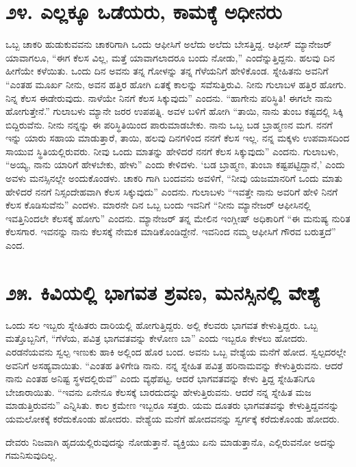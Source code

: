 \section{\num{೨೪. } ಎಲ್ಲಕ್ಕೂ ಒಡೆಯರು, ಕಾಮಕ್ಕೆ ಅಧೀನರು}

ಒಬ್ಬ ಚಾಕರಿ ಹುಡುಕುವವನು ಚಾಕರಿಗಾಗಿ ಒಂದು ಆಫೀಸಿಗೆ ಅಲೆದು ಅಲೆದು ಬೇಸತ್ತಿದ್ದ. ಆಫೀಸ್ ಮ್ಯಾನೇಜರ್ ಯಾವಾಗಲೂ, “ಈಗ ಕೆಲಸ ವಿಲ್ಲ, ಮತ್ತೆ ಯಾವಾಗಲಾದರೂ ಬಂದು ನೋಡು,” ಎಂದೆನ್ನುತ್ತಿದ್ದನು. ಹಲವು ದಿನ ಹೀಗೆಯೇ ಕಳೆಯಿತು. ಒಂದು ದಿನ ಅವನು ತನ್ನ ಗೋಳನ್ನು ತನ್ನ ಗೆಳೆಯನಿಗೆ ಹೇಳಿಕೊಂಡ. ಸ್ನೇಹಿತನು ಅವನಿಗೆ “ಎಂತಹ ಮೂರ್ಖ ನೀನು, ಅವನ ಹತ್ತಿರ ಹೋಗಿ ಏತಕ್ಕೆ ಕಾಲನ್ನು ಸವೆಸುತ್ತಿರುವಿ. ನೀನು ಗುಲಾಬಳ ಹತ್ತಿರ ಹೋಗು. ನಿನ್ನ ಕೆಲಸ ಈಡೇರುವುದು. ನಾಳೆಯೇ ನಿನಗೆ ಕೆಲಸ ಸಿಕ್ಕುವುದು” ಎಂದನು. “ಹಾಗೇನು ಪರಿಸ್ಥಿತಿ! ಈಗಲೇ ನಾನು ಹೋಗುತ್ತೇನೆ.” ಗುಲಾಬಳು ಮ್ಯಾನೇ ಜರರ ಉಪಪತ್ನಿ. ಅವಳ ಬಳಿಗೆ ಹೋಗಿ “ತಾಯಿ, ನಾನು ತುಂಬ ಕಷ್ಟದಲ್ಲಿ ಸಿಕ್ಕಿ ಬಿದ್ದಿರುವೆನು. ನೀನು ನನ್ನನ್ನು ಈ ಪರಿಸ್ಥಿತಿಯಿಂದ ಪಾರುಮಾಡಬೇಕು. ನಾನು ಒಬ್ಬ ಬಡ ಬ್ರಾಹ್ಮಣನ ಮಗ. ನನಗೆ ಇನ್ನು ಯಾರು ಸಹಾಯ ಮಾಡುತ್ತಾರೆ, ತಾಯಿ, ಹಲವು ದಿನಗಳಿಂದ ನನಗೆ ಕೆಲಸ ಇಲ್ಲ. ನನ್ನ ಮಕ್ಕಳು ಉಪವಾಸದಿಂದ ಸಾಯುವ ಸ್ಥಿತಿಯಲ್ಲಿರುವರು. ನೀವು ಒಂದು ಮಾತನ್ನು ಹೇಳಿದರೆ ನನಗೆ ಕೆಲಸ ಸಿಕ್ಕುವುದು” ಎಂದನು. ಗುಲಾಬಳು, “ಅಯ್ಯ, ನಾನು ಯಾರಿಗೆ ಹೇಳಬೇಕು, ಹೇಳು” ಎಂದು ಕೇಳಿದಳು. ‘ಬಡ ಬ್ರಾಹ್ಮಣ, ತುಂಬಾ ಕಷ್ಟಪಟ್ಟಿದ್ದಾನೆ,’ ಎಂದು ಅವಳು ಮನಸ್ಸಿನಲ್ಲೇ ಅಂದುಕೊಂಡಳು. ಚಾಕರಿ ಗಾಗಿ ಬಂದವನು ಅವಳಿಗೆ, “ನೀವು ಯಜಮಾನರಿಗೆ ಒಂದು ಮಾತು ಹೇಳಿದರೆ ನನಗೆ ನಿಸ್ಸಂದೇಹವಾಗಿ ಕೆಲಸ ಸಿಕ್ಕುವುದು” ಎಂದನು. ಗುಲಾಬಳು “ಇವತ್ತೇ ನಾನು ಅವರಿಗೆ ಹೇಳಿ ನಿನಗೆ ಕೆಲಸ ಕೊಡಿಸುವೆನು” ಎಂದಳು. ಮಾರನೇ ದಿನ ಒಬ್ಬ ಬಂದು ಇವನಿಗೆ “ನೀನು ಮ್ಯಾನೇಜರ್ ಆಫೀಸಿನಲ್ಲಿ ಇವತ್ತಿನಿಂದಲೇ ಕೆಲಸಕ್ಕೆ ಹೋಗು” ಎಂದನು. ಮ್ಯಾನೇಜರ್ ತನ್ನ ಮೇಲಿನ ಇಂಗ್ಲೀಷ್ ಅಧಿಕಾರಿಗೆ “ಈ ಮನುಷ್ಯ ನುರಿತ ಕೆಲಸಗಾರ. ಇವನನ್ನು ನಾನು ಕೆಲಸಕ್ಕೆ ನೇಮಕ ಮಾಡಿಕೊಂಡಿದ್ದೇನೆ. ಇವನಿಂದ ನಮ್ಮ ಆಫೀಸಿಗೆ ಗೌರವ ಬರುತ್ತದೆ” ಎಂದ.


\section{\num{೨೫.} ಕಿವಿಯಲ್ಲಿ ಭಾಗವತ ಶ್ರವಣ, ಮನಸ್ಸಿನಲ್ಲಿ ವೇಶ್ಯೆ}

ಒಂದು ಸಲ ಇಬ್ಬರು ಸ್ನೇಹಿತರು ದಾರಿಯಲ್ಲಿ ಹೋಗುತ್ತಿದ್ದರು. ಅಲ್ಲಿ ಕೆಲವರು ಭಾಗವತ ಕೇಳುತ್ತಿದ್ದರು. ಒಬ್ಬ ಮತ್ತೊಬ್ಬನಿಗೆ, “ಗೆಳೆಯ, ಪವಿತ್ರ ಭಾಗವತವನ್ನು ಕೇಳೋಣ ಬಾ” ಎಂದು ಇಬ್ಬರೂ ಕೇಳಲು ಹೋದರು. ಎರಡನೆಯವನು ಸ್ವಲ್ಪ ಇಣುಕು ಹಾಕಿ ಅಲ್ಲಿಂದ ಹೊರ ಬಂದ. ಅವನು ಒಬ್ಬ ವೇಶ್ಯೆಯ ಮನೆಗೆ ಹೋದ. ಸ್ವಲ್ಪದರಲ್ಲೇ ಅವನಿಗೆ ಅಸಹ್ಯವಾಯಿತು. “ಎಂತಹ ತಿಳಿಗೇಡಿ ನಾನು. ನನ್ನ ಸ್ನೇಹಿತ ಪವಿತ್ರ ಹರಿನಾಮವನ್ನು ಕೇಳುತ್ತಿರುವನು. ಆದರೆ ನಾನು ಎಂತಹ ಅನಿಷ್ಟ ಸ್ಥಳದಲ್ಲಿರುವೆ” ಎಂದು ವ್ಯಥೆಪಟ್ಟ. ಆದರೆ ಭಾಗವತವನ್ನು ಕೇಳು ತ್ತಿದ್ದ ಸ್ನೇಹಿತನಿಗೂ ಬೇಜಾರಾಯಿತು. “ಇವನು ಏನೇನೂ ಕೆಲಸಕ್ಕೆ ಬಾರದುದನ್ನು ಹೇಳುತ್ತಿರುವನು. ಆದರೆ ನನ್ನ ಸ್ನೇಹಿತ ಮಜ ಮಾಡುತ್ತಿರುವನು” ಎನ್ನಿಸಿತು. ಕಾಲ ಕ್ರಮೇಣ ಇಬ್ಬರೂ ಸತ್ತರು. ಯಮ ದೂತರು ಭಾಗವತವನ್ನು ಕೇಳುತ್ತಿದ್ದವನನ್ನು ಯಮಲೋಕಕ್ಕೆ ಕರೆದುಕೊಂಡು ಹೋದರು. ವೇಶ್ಯೆಯ ಮನೆಗೆ ಹೋದವನನ್ನು ಸ್ವರ್ಗಕ್ಕೆ ಕರೆದುಕೊಂಡು ಹೋದರು.

ದೇವರು ನಿಜವಾಗಿ ಹೃದಯಲ್ಲಿರುವುದನ್ನು ನೋಡುತ್ತಾನೆ. ವ್ಯಕ್ತಿಯು ಏನು ಮಾಡುತ್ತಾನೊ, ಎಲ್ಲಿರುವನೋ ಅದನ್ನು ಗಮನಿಸುವುದಿಲ್ಲ.


